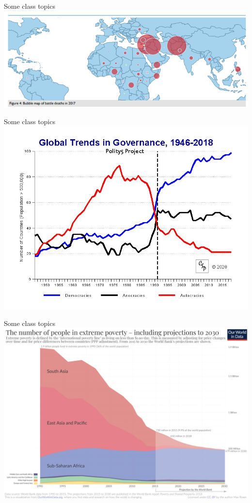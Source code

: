 \documentclass[handout]{beamer}
\begin{document}
\begin{frame}{\LARGE Some class topics}  %
\includegraphics[width=\textwidth]{battle deaths.png}
\end{frame}

\begin{frame}{\LARGE Some class topics}
\centering
\includegraphics[width=\textwidth,height=0.8\textheight,keepaspectratio]{Global trends governance.jpg}
\end{frame}

\begin{frame}{\LARGE Some class topics}
\centering
\includegraphics[width=\textwidth,height=0.8\textheight,keepaspectratio]{Extreme-Poverty-projection-by-the-World-Bank-to-2030.png}
\end{frame}
\end{document}
